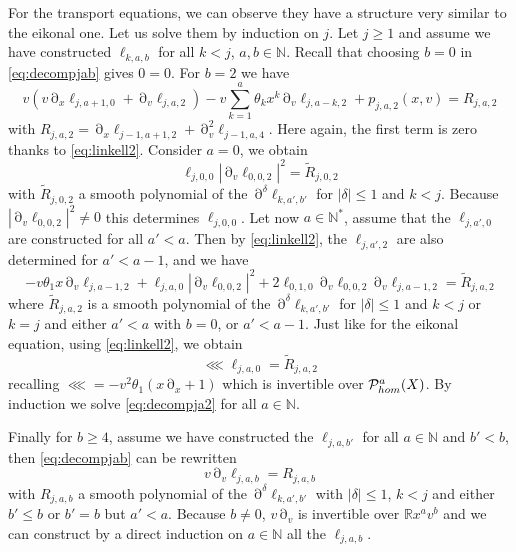 \documentclass[12pt]{amsart}
\newcommand{\N}{\mathbb N}
\newcommand{\R}{\mathbb R}
\numberwithin{equation}{section}
\numberwithin{figure}{section}
\DeclareMathOperator{\p}{\partial}
\begin{document}
For the transport equations, we can observe they have a structure very similar to the eikonal one. Let us solve them by induction on $j$. Let $j\geq1$ and assume we have constructed $\ell_{k,a,b}$ for all $k<j$, $a,b\in\N$. Recall that choosing $b=0$ in \eqref{eq:decompjab} gives $0=0$. For $b=2$ we have
\begin{equation*}
v(v\p_x\ell_{j,a+1,0} + \p_v\ell_{j,a,2}) - v\sum_{k=1}^a\theta_kx^k\p_v\ell_{j,a-k,2} + p_{j,a,2}(x,v) = R_{j,a,2}
\end{equation*}
with $R_{j,a,2} = \p_x\ell_{j-1,a+1,2} + \p_v^2\ell_{j-1,a,4}$. Here again, the first term is zero thanks to \eqref{eq:linkell2}. Consider $a=0$, we obtain
\begin{equation*}
\ell_{j,0,0}|\p_v\ell_{0,0,2}|^2 = \tilde R_{j,0,2}
\end{equation*}
with $\tilde R_{j,0,2}$ a smooth polynomial of the $\p^\delta\ell_{k,a',b'}$ for $|\delta|\leq1$ and $k<j$. Because $|\p_v\ell_{0,0,2}|^2 \neq 0$ this determines $\ell_{j,0,0}$. Let now $a\in\N^*$, assume that the $\ell_{j,a',0}$ are constructed for all $a'<a$. Then by \eqref{eq:linkell2}, the $\ell_{j,a',2}$ are also determined for $a'<a-1$, and we have
\begin{equation}\label{eq:decompja2}
-v\theta_1x\p_v\ell_{j,a-1,2} + \ell_{j,a,0}|\p_v\ell_{0,0,2}|^2 + 2\ell_{0,1,0}\p_v\ell_{0,0,2}\p_v\ell_{j,a-1,2} = \tilde R_{j,a,2}
\end{equation}
where $\tilde R_{j,a,2}$ is a smooth polynomial of the $\p^\delta\ell_{k,a',b'}$ for $|\delta|\leq1$ and $k<j$ or $k=j$ and either $a'<a$ with $b=0$, or $a'<a-1$. Just like for the eikonal equation, using \eqref{eq:linkell2}, we obtain
\begin{equation*}
\lll\ell_{j,a,0} = \tilde R_{j,a,2}
\end{equation*}
recalling $\lll = -v^2\theta_1(x\p_x+1)$ which is invertible over ${\mathcal P}^a_{hom}(X)$. By induction we solve \eqref{eq:decompja2} for all $a\in\N$.

Finally for $b\geq4$, assume we have constructed the $\ell_{j,a,b'}$ for all $a\in\N$ and $b'<b$, then \eqref{eq:decompjab} can be rewritten
\begin{equation*}
v\p_v\ell_{j,a,b} = R_{j,a,b}
\end{equation*}
with $R_{j,a,b}$ a smooth polynomial of the $\p^\delta\ell_{k,a',b'}$ with $|\delta|\leq1$, $k<j$ and either $b'\leq b$ or $b'=b$ but $a'<a$. Because $b\neq0$, $v\p_v$ is invertible over $\R x^av^b$ and we can construct by a direct induction on $a\in\N$ all the $\ell_{j,a,b}$.
\end{document}

